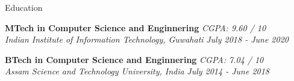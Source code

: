 \documentclass{resume} %
\begin{document}
\begin{rSection}{Education}  

    {\bf \large MTech in Computer Science and Enginnering}
    \hfill \textit{CGPA: 9.60 / 10}
    \\ \textit{Indian Institute of Information Technology, Guwahati} 
    \hfill {\em July 2018 - June 2020}
    \par\vspace{7px}

    {\bf \large BTech in Computer Science and Enginnering}
    \hfill \textit{CGPA: 7.04 / 10}
    \\ \textit{Assam Science and Technology University, India} 
    \hfill {\em July 2014 - June 2018}
    \par\vspace{7px}





\end{rSection}
\end{document}
